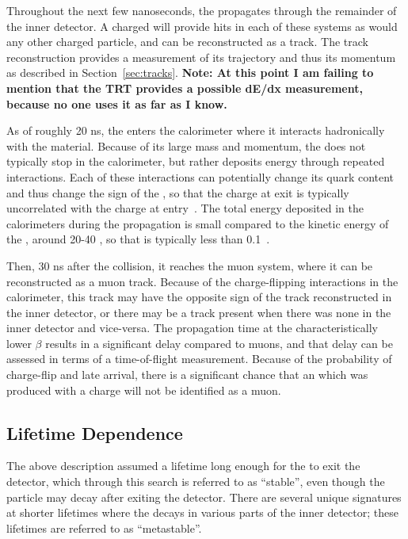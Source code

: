 Throughout the next few nanoseconds, the \rhadron propagates through the remainder of the inner detector.
A charged \rhadron will provide hits in each of these systems as would any other charged particle, and can be reconstructed as a track.
The track reconstruction provides a measurement of its trajectory and thus its momentum as described in Section~\ref{sec:tracks}.
\textbf{Note: At this point I am failing to mention that the TRT provides a possible dE/dx measurement, because no one uses it as far as I know.}

As of roughly 20 ns, the \rhadron enters the calorimeter where it interacts hadronically with the material.
Because of its large mass and momentum, the \rhadron does not typically stop in the calorimeter, but rather deposits energy through repeated interactions.
Each of these interactions can potentially change its quark content and thus change the sign of the \rhadron, so that the charge at exit is typically uncorrelated with the charge at entry~\cite{rhad_atlas}.
The total energy deposited in the calorimeters during the propagation is small compared to the kinetic energy of the \rhadron, around 20-40 \GeV, so that \ep is typically less than 0.1~\cite{rhad_atlas}.

Then, 30 ns after the collision, it reaches the muon system, where it can be reconstructed as a muon track.
Because of the charge-flipping interactions in the calorimeter, this track may have the opposite sign of the track reconstructed in the inner detector, or there may be a track present when there was none in the inner detector and vice-versa.
The propagation time at the characteristically lower $\beta$ results in a significant delay compared to muons, and that delay can be assessed in terms of a time-of-flight measurement.
Because of the probability of charge-flip and late arrival, there is a significant chance that an \rhadron which was produced with a charge will not be identified as a muon.

\subsection{Lifetime Dependence}
\label{sec:rh_lifetimes}

The above description assumed a lifetime long enough for the \rhadron to exit the detector, which through this search is referred to as ``stable'', even though the particle may decay after exiting the detector.
There are several unique signatures at shorter lifetimes where the \rhadron decays in various parts of the inner detector; these lifetimes are referred to as ``metastable''.

